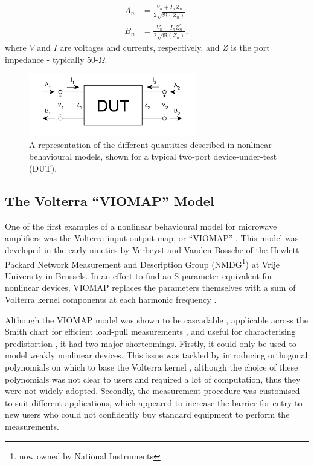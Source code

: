 \documentclass[../thesis/thesis.tex]{subfiles}
\begin{document}
\begin{align}
	A_n &= \frac{V_n + I_n Z_n}{2\sqrt{\Re(Z_n)}} \\
	B_n &= \frac{V_n - I_n Z^*_n}{2\sqrt{\Re(Z_n)}},
\end{align}
where $V$ and $I$ are voltages and currents, respectively, and $Z$ is the port impedance - typically 50-$\Omega$.

\begin{figure}[b]
	\centering
	\includegraphics[width=0.65\textwidth]{dut}
	\caption[Device-under-test model representation.]{A representation of the different quantities described in nonlinear behavioural models, shown for a typical two-port device-under-test (DUT).}
	\label{ch5_fig_dut}
\end{figure}

\subsection{The Volterra ``VIOMAP'' Model}

One of the first examples of a nonlinear behavioural model for microwave amplifiers was the Volterra input-output map, or ``VIOMAP'' \cite{Verbeyst_1994}. This model was developed in the early nineties by Verbeyst and Vanden Bossche of the Hewlett Packard Network Measurement and Description Group (NMDG\footnote{now owned by National Instruments}) at Vrije University in Brussels. In an effort to find an S-parameter equivalent for nonlinear devices, VIOMAP replaces the parameters themselves with a sum of Volterra kernel components at each harmonic frequency \cite{Schetzen_2006, Moodi_2010}.

Although the VIOMAP model was shown to be cascadable \cite{Verbeyst_1994}, applicable across the Smith chart for efficient load-pull measurements \cite{Verbeyst_1995b}, and useful for characterising predistortion \cite{Verbeyst_1995}, it had two major shortcomings. Firstly, it could only be used to model weakly nonlinear devices. This issue was tackled by introducing orthogonal polynomials on which to base the Volterra kernel \cite{Verbeyst_1996}, although the choice of these polynomials was not clear to users and required a lot of computation, thus they were not widely adopted. Secondly, the measurement procedure was customised to suit different applications, which appeared to increase the barrier for entry to new users who could not confidently buy standard equipment to perform the measurements.
\end{document}
